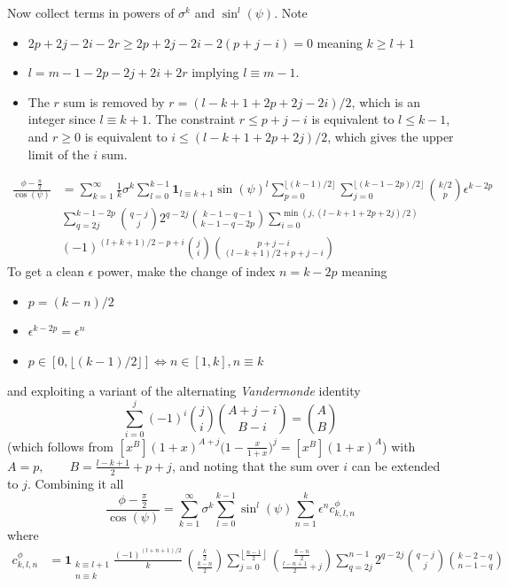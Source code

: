 \documentclass[a4paper]{amsart}
\begin{document}
Now collect terms in powers of $\sigma^k$ and $\sin^l(\psi)$. Note
\begin{itemize}
\item $2p+2j-2i-2r\geq 2p+2j-2i-2(p+j-i)=0$ meaning $k\geq l+1$
\item $l = m-1-2p-2j+2i+2r$ implying $l\equiv m-1$.
\item The $r$ sum is removed by $r=(l-k+1+2p+2j-2i)/2$, which is an integer since $l\equiv k+1$. The constraint $r\leq p+j-i$ is equivalent to $l\leq k-1$, and $r\geq0$ is equivalent to $i\leq(l-k+1+2p+2j)/2$, which gives the upper limit of the $i$ sum.
\end{itemize}
\begin{align*}
\frac{\phi-\tfrac{\pi}{2}}{\cos(\psi)}&=\sum_{k=1}^\infty\frac{1}{k}\sigma^k\sum_{l=0}^{k-1}\mathbf{1}_{l\equiv k+1}\sin(\psi)^l
%
\sum_{p=0}^{\lfloor (k-1)/2\rfloor}
%
\sum_{j=0}^{\lfloor (k-1-2p)/2\rfloor}\binom{k/2}{p}\epsilon^{k-2p}\\
%
&\sum_{q=2j}^{k-1-2p}\binom{q-j}{j}2^{q-2j}
\binom{k-1-q-1}{k-1-q-2p}
%
\sum_{i=0}^{\min(j,(l - k +1+2p+2j)/2)}\\&(-1)^{(l+k+1)/2-p+i}\binom{j}{i}\binom{p+j-i}{(l - k +1)/2+p+j-i}
\end{align*}
To get a clean $\epsilon$ power, make the change of index $n=k-2p$ meaning
\begin{itemize}
\item $p=(k-n)/2$
\item $\epsilon^{k-2p}=\epsilon^n$
\item $p\in[0,\lfloor (k-1)/2\rfloor]\Leftrightarrow n\in[1,k],n\equiv k$
\end{itemize}
and exploiting a variant of the alternating \emph{Vandermonde} identity
\begin{equation*}
\sum_{i=0}^{j}(-1)^i
\binom ji
\binom{A+j-i}{B-i}
=
\binom{A}{B}
\end{equation*}
(which follows from $[x^B](1+x)^{A+j}\big(1-\tfrac{x}{1+x}\big)^j=[x^B](1+x)^A$)
with $A=p,\qquad B=\frac{l-k+1}{2}+p+j$, and noting that the sum over $i$ can be extended to $j$.
%
Combining it all
\begin{equation}
\frac{\phi-\tfrac{\pi}{2}}{\cos(\psi)}
=
\sum^\infty_{k=1}
\sigma^k\sum_{l=0}^{k-1}\sin^l(\psi)\sum_{n=1}^k\epsilon^nc^{\phi}_{k,l,n}\label{eq:phi_sparse_expansion}
\end{equation}
where %
\begin{align*}
c^{\phi}_{k,l,n}&=
\mathbf{1}_{\substack{k\equiv l+1\\ n\equiv k}}\frac{(-1)^{(l+n+1)/2}}{k}\,\binom{\tfrac{k}{2}}{\tfrac{k-n}{2}}
\sum_{j=0}^{\left\lfloor\frac{n-1}{2}\right\rfloor}
\binom{\tfrac{k-n}{2}}{\tfrac{l - n + 1}{2}+j}
\sum_{q=2j}^{n-1}
2^{q-2j}
\binom{\scriptstyle q-j}{\scriptstyle j}
\binom{\scriptstyle k-2-q}{\scriptstyle n-1-q}
\end{align*}
\end{document}
